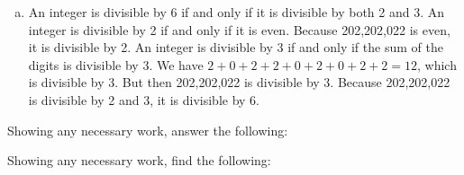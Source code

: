 \documentclass[12pt,letterpaper]{exam}
\begin{document}
\begin{questions}
{\begin{enumerate}[(a)]
\item An integer is divisible by 6 if and only if it is divisible by both 2 and 3. An integer is divisible by 2 if and only if it is even. Because 202,202,022 is even, it is divisible by 2. An integer is divisible by 3 if and only if the sum of the digits is divisible by 3. We have $2 + 0 + 2 + 2 + 0 + 2 + 0 + 2 + 2= 12$, which is divisible by 3. But then 202,202,022 is divisible by 3. Because 202,202,022 is divisible by 2 and 3, it is divisible by 6. 
\end{enumerate}
}



\newpage
\question  Showing any necessary work, answer the following:
	 \pspace




\newpage
\question Showing any necessary work, find the following:
\end{questions}
\end{document}
